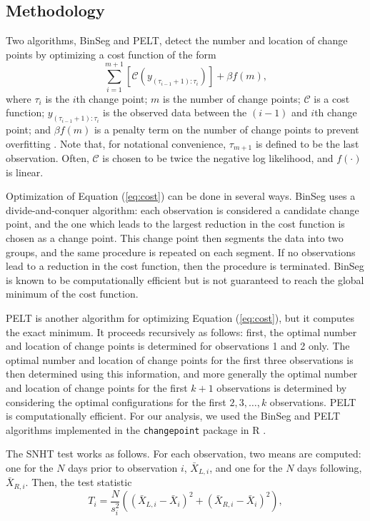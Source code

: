 \documentclass[12pt]{article}
\begin{document}
\begin{doublespacing}
\subsection{Methodology}
\label{ssec:methodology}

Two algorithms, BinSeg and PELT, detect the number and location of change points by optimizing a cost function of the form
\begin{equation}
	\sum_{i=1}^{m+1} [\mathcal{C}(y_{(\tau_{i-1}+1):\tau_i})] + \beta f(m),
	\label{eq:cost}
\end{equation}
where $\tau_i$ is the $i$th change point; $m$ is the number of change points; $\mathcal{C}$ is a cost function; $y_{(\tau_{i-1}+1):\tau_i}$ is the observed data between the $(i-1)$ and $i$th change point; and $\beta f(m)$ is a penalty term on the number of change points to prevent overfitting \cite{killick12}.  Note that, for notational convenience, $\tau_{m+1}$ is defined to be the last observation.  Often, $\mathcal{C}$ is chosen to be twice the negative log likelihood, and $f(\cdot)$ is linear.

Optimization of Equation (\ref{eq:cost}) can be done in several ways.  BinSeg uses a divide-and-conquer algorithm: each observation is considered a candidate change point, and the one which leads to the largest reduction in the cost function is chosen as a change point.  This change point then segments the data into two groups, and the same procedure is repeated on each segment.  If no observations lead to a reduction in the cost function, then the procedure is terminated.  BinSeg is known to be computationally efficient but is not guaranteed to reach the global minimum of the cost function.

PELT is another algorithm for optimizing Equation (\ref{eq:cost}), but it computes the exact minimum.  It proceeds recursively as follows: first, the optimal number and location of change points is determined for observations 1 and 2 only.  The optimal number and location of change points for the first three observations is then determined using this information, and more generally the optimal number and location of change points for the first $k+1$ observations is determined by considering the optimal configurations for the first $2, 3, \ldots, k$ observations.  PELT is computationally efficient.  For our analysis, we used the BinSeg and PELT algorithms implemented in the \texttt{changepoint} package in R \cite{killick14}.

The SNHT test works as follows.  For each observation, two means are computed: one for the $N$ days prior to observation $i$, $\bar{X}_{L,i}$, and one for the $N$ days following, $\bar{X}_{R,i}$.  Then, the test statistic
\begin{equation}
	T_i = \frac{N}{s_i^2}\left( (\bar{X}_{L,i}-\bar{X}_i)^2 + (\bar{X}_{R,i}-\bar{X}_i)^2\right),
	\label{eq:Hom}
\end{equation}


\end{doublespacing}
\end{document}
